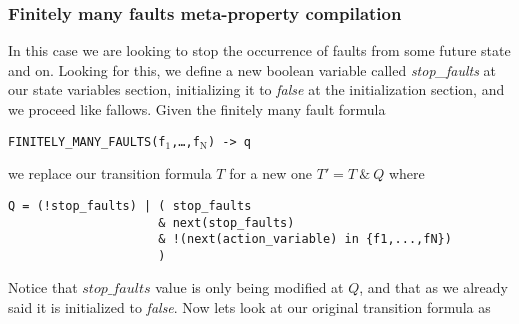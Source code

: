 \documentclass[12pt]{article}
\newcommand{\textusc}[1]{$_{\text{#1}}$} %
\begin{document}
\subsubsection*{Finitely many faults meta-property compilation}
In this case we are looking to stop the occurrence of faults from some future state and on. Looking for this, we define a new boolean variable called \textit{stop\_faults} at our state variables section, initializing it to \textit{false} at the initialization section, and we proceed like fallows. Given the finitely many fault formula
\begin{center}
\texttt{FINITELY\_MANY\_FAULTS(f\textusc{1},\ldots,f\textusc{N}) -> q}
\end{center}
we replace our transition formula $T$ for a new one $T' = T ~\&~ Q$ where
\begin{verbatim}
Q = (!stop_faults) | ( stop_faults
                     & next(stop_faults)
                     & !(next(action_variable) in {f1,...,fN})
                     )
\end{verbatim}
Notice that $stop\_faults$ value is only being modified at $Q$, and that as we already said it is initialized to \textit{false}. Now lets look at our original transition formula as 
\end{document}
